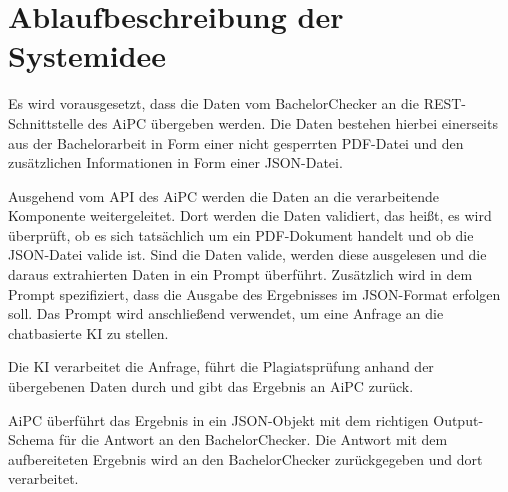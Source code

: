 \chapter{Ablaufbeschreibung der Systemidee}\label{ch:ablaufbeschreibung}

Es wird vorausgesetzt, dass die Daten vom BachelorChecker an die \ac{REST}-Schnittstelle des \ac{AiPC} übergeben werden.
Die Daten bestehen hierbei einerseits aus der Bachelorarbeit in Form einer nicht gesperrten \ac{PDF}-Datei und den zusätzlichen Informationen in Form einer \ac{JSON}-Datei.

Ausgehend vom \ac{API} des \ac{AiPC} werden die Daten an die verarbeitende Komponente weitergeleitet.
Dort werden die Daten validiert, das heißt, es wird überprüft, ob es sich tatsächlich um ein \ac{PDF}-Dokument handelt und ob die \ac{JSON}-Datei valide ist.
Sind die Daten valide, werden diese ausgelesen und die daraus extrahierten Daten in ein Prompt überführt.
Zusätzlich wird in dem Prompt spezifiziert, dass die Ausgabe des Ergebnisses im \ac{JSON}-Format erfolgen soll.
Das Prompt wird anschließend verwendet, um eine Anfrage an die chatbasierte \ac{KI} zu stellen.

Die \ac{KI} verarbeitet die Anfrage, führt die Plagiatsprüfung anhand der übergebenen Daten durch und gibt das Ergebnis an \ac{AiPC} zurück.

\ac{AiPC} überführt das Ergebnis in ein \ac{JSON}-Objekt mit dem richtigen Output-Schema für die Antwort an den BachelorChecker.
Die Antwort mit dem aufbereiteten Ergebnis wird an den BachelorChecker zurückgegeben und dort verarbeitet.
